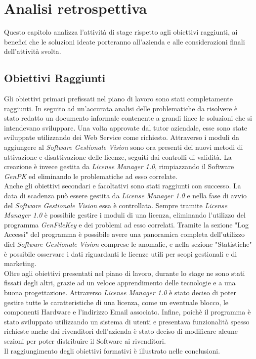 
\chapter{Analisi retrospettiva}
\label{cap:analisi-retrospettiva}
Questo capitolo analizza l'attività di stage rispetto agli obiettivi raggiunti, ai benefici che le soluzioni ideate porteranno all'azienda e alle considerazioni finali dell'attività svolta.


\section{Obiettivi Raggiunti}

Gli obiettivi primari prefissati nel piano di lavoro sono stati completamente raggiunti. In seguito ad un'accurata analisi delle problematiche da risolvere è stato redatto un documento informale contenente a grandi linee le soluzioni che si intendevano sviluppare. Una volta approvate dal tutor aziendale, esse sono state sviluppate utilizzando dei Web Service come richiesto. Attraverso i moduli da aggiungere al \textit{Software Gestionale Vision} sono ora presenti dei nuovi metodi di attivazione e disattivazione delle licenze, seguiti dai controlli di validità. La creazione è invece gestita da \textit{License Manager 1.0}, rimpiazzando il Software \textit{GenPK} ed eliminando le problematiche ad esso correlate.
\\Anche gli obiettivi secondari e facoltativi sono stati raggiunti con successo. La data di scadenza può essere gestita da \textit{License Manager 1.0} e nella fase di avvio del \textit{Software Gestionale Vision} essa è controllata. Sempre tramite \textit{License Manager 1.0} è possibile gestire i moduli di una licenza, eliminando l'utilizzo del programma \textit{GenFileKey} e dei problemi ad esso correlati. Tramite la sezione "Log Accessi" del programma è possibile avere una panoramica completa dell'utilizzo diel \textit{Software Gestionale Vision} comprese le anomalie, e nella sezione "Statistiche" è possibile osservare i dati riguardanti le licenze utili per scopi gestionali e di marketing.
\\Oltre agli obiettivi presentati nel piano di lavoro, durante lo stage ne sono stati fissati degli altri, grazie ad un veloce apprendimento delle tecnologie e a una buona progettazione. Attraverso \textit{License Manager 1.0} è stato deciso di poter gestire tutte le caratteristiche di una licenza, come un eventuale blocco, le componenti Hardware e l'indirizzo Email associato. Infine, poichè il programma è stato sviluppato utilizzando un sistema di utenti e presentava funzionalità spesso richieste anche dai rivenditori dell'azienda è stato deciso di modificare alcune sezioni per poter distribuire il Software ai rivenditori.
\\Il raggiungimento degli obiettivi formativi è illustrato nelle conclusioni.

